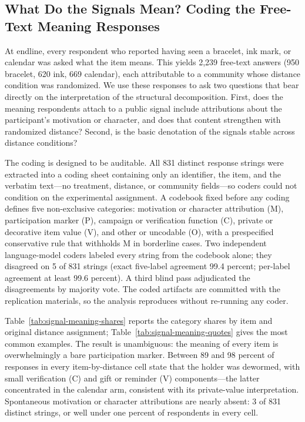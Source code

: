 \documentclass[12pt]{article}
\begin{document}
\providecommand{\StructuralRobustnessPath}{appendix/structural-robustness}

\subsection{What Do the Signals Mean? Coding the Free-Text Meaning Responses}
\label{app:signal-meaning-coding}

At endline, every respondent who reported having seen a bracelet, ink mark, or
calendar was asked what the item means. This yields 2{,}239 free-text answers
(950 bracelet, 620 ink, 669 calendar), each attributable to a community whose
distance condition was randomized. We use these responses to ask two questions
that bear directly on the interpretation of the structural decomposition.
First, does the meaning respondents attach to a public signal include
attributions about the participant's motivation or character, and does that
content strengthen with randomized distance? Second, is the basic denotation
of the signals stable across distance conditions?

The coding is designed to be auditable. All 831 distinct response strings were
extracted into a coding sheet containing only an identifier, the item, and the
verbatim text---no treatment, distance, or community fields---so coders could
not condition on the experimental assignment. A codebook fixed before any
coding defines five non-exclusive categories: motivation or character
attribution (M), participation marker (P), campaign or verification function
(C), private or decorative item value (V), and other or uncodable (O), with a
prespecified conservative rule that withholds M in borderline cases. Two
independent language-model coders labeled every string from the codebook
alone; they disagreed on 5 of 831 strings (exact five-label agreement 99.4
percent; per-label agreement at least 99.6 percent). A third blind pass
adjudicated the disagreements by majority vote. The coded artifacts are
committed with the replication materials, so the analysis reproduces without
re-running any coder.

Table~\ref{tab:signal-meaning-shares} reports the category shares by item and
original distance assignment; Table~\ref{tab:signal-meaning-quotes} gives the
most common examples. The result is unambiguous: the meaning of every item is
overwhelmingly a bare participation marker. Between 89 and 98 percent of
responses in every item-by-distance cell state that the holder was dewormed,
with small verification (C) and gift or reminder (V) components---the latter
concentrated in the calendar arm, consistent with its private-value
interpretation. Spontaneous motivation or character attributions are nearly
absent: 3 of 831 distinct strings, or well under one percent of respondents in
every cell.
\end{document}

